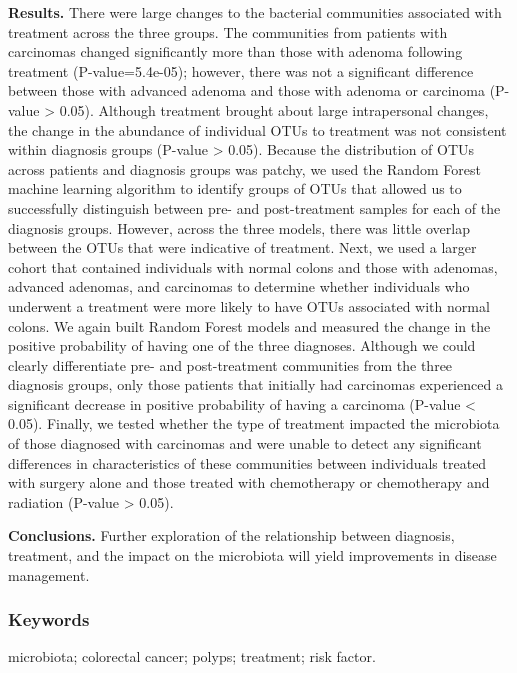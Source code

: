 \documentclass[12pt,]{article}
\begin{document}
\textbf{Results.} There were large changes to the bacterial communities
associated with treatment across the three groups. The communities from
patients with carcinomas changed significantly more than those with
adenoma following treatment (P-value=5.4e-05); however, there was not a
significant difference between those with advanced adenoma and those
with adenoma or carcinoma (P-value \textgreater{} 0.05). Although
treatment brought about large intrapersonal changes, the change in the
abundance of individual OTUs to treatment was not consistent within
diagnosis groups (P-value \textgreater{} 0.05). Because the distribution
of OTUs across patients and diagnosis groups was patchy, we used the
Random Forest machine learning algorithm to identify groups of OTUs that
allowed us to successfully distinguish between pre- and post-treatment
samples for each of the diagnosis groups. However, across the three
models, there was little overlap between the OTUs that were indicative
of treatment. Next, we used a larger cohort that contained individuals
with normal colons and those with adenomas, advanced adenomas, and
carcinomas to determine whether individuals who underwent a treatment
were more likely to have OTUs associated with normal colons. We again
built Random Forest models and measured the change in the positive
probability of having one of the three diagnoses. Although we could
clearly differentiate pre- and post-treatment communities from the three
diagnosis groups, only those patients that initially had carcinomas
experienced a significant decrease in positive probability of having a
carcinoma (P-value \textless{} 0.05). Finally, we tested whether the
type of treatment impacted the microbiota of those diagnosed with
carcinomas and were unable to detect any significant differences in
characteristics of these communities between individuals treated with
surgery alone and those treated with chemotherapy or chemotherapy and
radiation (P-value \textgreater{} 0.05).

\textbf{Conclusions.} Further exploration of the relationship between
diagnosis, treatment, and the impact on the microbiota will yield
improvements in disease management.

\newpage

\subsubsection{Keywords}\label{keywords}

microbiota; colorectal cancer; polyps; treatment; risk factor.
\end{document}
